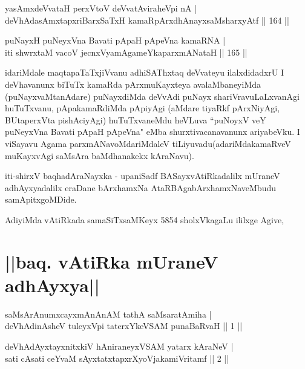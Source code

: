 
\begin{shl}
yasAmxdeVvataH perxVtoV deVvatAviraheV\s pi nA |\\
deVhAdasAmxtapxriBarxSaTxH kamaRpArxdhAnayxsaMsharxyAtf \hfill || 164 ||
\end{shl}

\begin{shl}
puNayxH puNeyxVna Bavati pApaH pApeVna kamaRNA |\\
iti shwrxtaM vacoV jecnxVyamAgameYkaparxmANataH \hfill || 165 ||
\end{shl}

\begin{artha}
idariMdale maqtapaTaTxjiVvanu adhiSAThxtaq deVvateyu ilalxdidadxrU I deVhavanunx biTuTx kamaRda pArxmuKayxteya avalaMbaneyiMda (puNayxvaMtanAdare) puNayxdiMda deVvAdi puNayx shariVravuLaLxvanAgi huTuTxvanu, pApakamaRdiMda pApiyAgi (aMdare tiyaRkf pArxNiyAgi, BUtaperxVta pishAciyAgi) huTuTxvaneMdu heVLuva ``puNoyxV veY puNeyxVna Bavati pApaH pApeVna" eMba shurxtivacanavanunx ariyabeVku. I viSayavu Agama parxmANavoMdariMdaleV tiLiyuvadu(adariMdakamaRveV muKayxvAgi saMsAra baMdhanakekx kAraNavu).
\end{artha}

\begin{center}
iti-shirxV baqhadAraNayxka - upaniSadf BASayxvAtiRkadalilx mUraneV adhAyxyadalilx eraDane bArxhamxNa AtaRBAgabArxhamxNaveMbudu samApitxgoMDide.
\end{center}

\begin{center}
AdiyiMda vAtiRkada samaSiTxsaMKeyx 5854 sholxVkagaLu ililxge Agive,
\end{center}

\section*{||baq. vAtiRka mUraneV adhAyxya||}


\begin{shl}
saMsArAnumxcayxmAnAnAM tathA saMsaratAmiha |\\
deVhAdinAsheV tuleyxV\s pi taterxYkeVSAM punaBaRvaH \hfill || 1 ||
\end{shl}

\begin{shl}
deVhAdAyxtayxnitxkiV hAniraneyxVSAM yatarx kAraNeV |\\
sati cAsati ceYvaM sAyxtatxtapxrXyoVjakamiVritamf \hfill || 2 ||
\end{shl}

